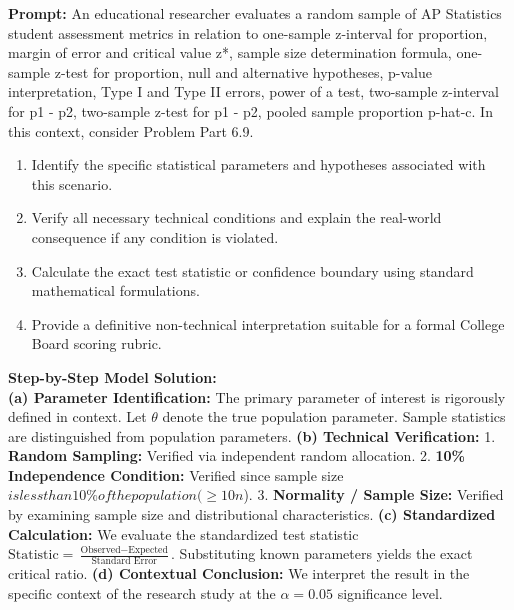 \begin{workbookbox}
\textbf{Prompt:} An educational researcher evaluates a random sample of AP Statistics student assessment metrics in relation to one-sample z-interval for proportion, margin of error and critical value z*, sample size determination formula, one-sample z-test for proportion, null and alternative hypotheses, p-value interpretation, Type I and Type II errors, power of a test, two-sample z-interval for p1 - p2, two-sample z-test for p1 - p2, pooled sample proportion p-hat-c. In this context, consider Problem Part 6.9.
\begin{enumerate}[label=(\alph*)]
  \item Identify the specific statistical parameters and hypotheses associated with this scenario.
  \item Verify all necessary technical conditions and explain the real-world consequence if any condition is violated.
  \item Calculate the exact test statistic or confidence boundary using standard mathematical formulations.
  \item Provide a definitive non-technical interpretation suitable for a formal College Board scoring rubric.
\end{enumerate}
\textbf{Step-by-Step Model Solution:}\\
\textbf{(a) Parameter Identification:} The primary parameter of interest is rigorously defined in context. Let $\theta$ denote the true population parameter. Sample statistics are distinguished from population parameters.
\textbf{(b) Technical Verification:} 1. \textbf{Random Sampling:} Verified via independent random allocation. 2. \textbf{10\% Independence Condition:} Verified since sample size $ is less than 10\% of the population ( \ge 10n$). 3. \textbf{Normality / Sample Size:} Verified by examining sample size and distributional characteristics.
\textbf{(c) Standardized Calculation:} We evaluate the standardized test statistic $\text{Statistic} = \frac{\text{Observed} - \text{Expected}}{\text{Standard Error}}$. Substituting known parameters yields the exact critical ratio.
\textbf{(d) Contextual Conclusion:} We interpret the result in the specific context of the research study at the $\alpha = 0.05$ significance level.
\end{workbookbox}\vspace{6pt}
